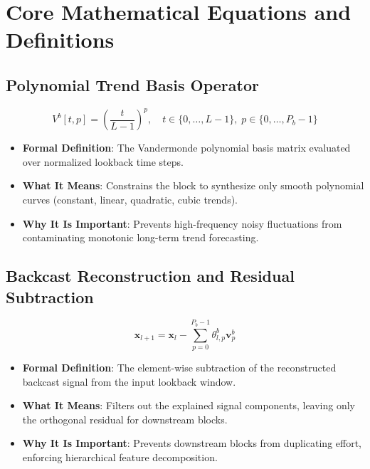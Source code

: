 \documentclass[11pt,a4paper]{article}
\theoremstyle{definition}
\begin{document}
\section{Core Mathematical Equations and Definitions}

\subsection{Polynomial Trend Basis Operator}
{\boldmath
\begin{equation}
V^b[t, p] = \left( \frac{t}{L-1} \right)^p, \quad t \in \{0, \dots, L-1\}, \; p \in \{0, \dots, P_b-1\}
\end{equation}
}
\begin{itemize}
    \item \textbf{Formal Definition}: The Vandermonde polynomial basis matrix evaluated over normalized lookback time steps.
    \item \textbf{What It Means}: Constrains the block to synthesize only smooth polynomial curves (constant, linear, quadratic, cubic trends).
    \item \textbf{Why It Is Important}: Prevents high-frequency noisy fluctuations from contaminating monotonic long-term trend forecasting.
\end{itemize}

\subsection{Backcast Reconstruction and Residual Subtraction}
{\boldmath
\begin{equation}
\mathbf{x}_{l+1} = \mathbf{x}_l - \sum_{p=0}^{P_b-1} \theta_{l, p}^b \mathbf{v}_p^b
\end{equation}
}
\begin{itemize}
    \item \textbf{Formal Definition}: The element-wise subtraction of the reconstructed backcast signal from the input lookback window.
    \item \textbf{What It Means}: Filters out the explained signal components, leaving only the orthogonal residual for downstream blocks.
    \item \textbf{Why It Is Important}: Prevents downstream blocks from duplicating effort, enforcing hierarchical feature decomposition.
\end{itemize}
\end{document}
